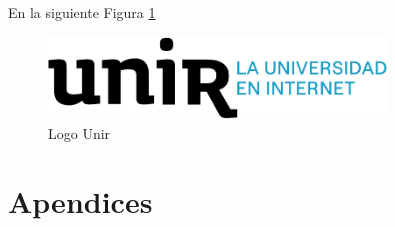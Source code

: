 \documentclass[11pt,a4paper,spanish]{book}
\numberwithin{equation}{chapter}
\numberwithin{figure}{chapter}
\begin{document}
En la siguiente Figura \ref{fig:fig1secCTF}

\begin{figure}[h]
\includegraphics[width= 0.8\textwidth]{logo_unir}
\caption{Logo Unir}
\label{fig:fig1secCTF}
\end{figure}

\cite{PIMENTEL2016744} \cite{da_S_Bessa_2023}




\appendix
\chapter{Apendices}
\end{document}
